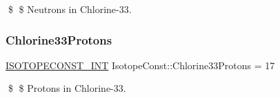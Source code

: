 \$ \$ Neutrons in Chlorine-\/33. \mbox{\label{group___isotope_const-_chlorine-_cl33_gaa84405b6e44708e879ee691464d7efc6}} 
\subsubsection{\texorpdfstring{Chlorine33\+Protons}{Chlorine33Protons}}
{\footnotesize\ttfamily \mbox{\hyperlink{group___isotope_const-_macros_ga5f18360b3e99483a35c32d789e62621c}{I\+S\+O\+T\+O\+P\+E\+C\+O\+N\+S\+T\+\_\+\+I\+NT}} Isotope\+Const\+::\+Chlorine33\+Protons = 17}

\$ \$ Protons in Chlorine-\/33. 